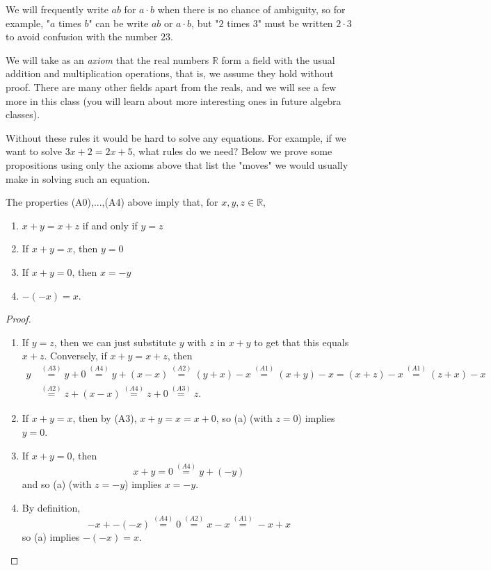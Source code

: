 \documentclass[11pt,dvipsnames]{book}
\numberwithin{figure}{section} %
\numberwithin{table}{section} %
\begin{document}
We will frequently write $ab$ for $a\cdot b$ when there is no chance of ambiguity, so for example, "$a$ times $b$" can be write $ab$ or $a\cdot b$, but "$2$ times $3$" must be written $2\cdot 3$ to avoid confusion with the number $23$.

We will take as an {\it axiom} that the real numbers $\mathbb{R}$ form a field with the usual addition and multiplication operations, that is, we assume they hold without proof.  There are many other fields apart from the reals, and we will see a few more in this class (you will learn about more interesting ones in future algebra classes).

Without these rules it would be hard to solve any equations. For example, if we want to solve $3x+2=2x+5$, what rules do we need? Below we prove some propositions using only the axioms above that list the "moves" we would usually make in solving such an equation.

\begin{proposition}
\label{p:field-consequences}
The properties (A0),...,(A4) above imply that, for $x,y,z\in \mathbb{R}$,
\begin{enumerate}[label=(\alph*)]
\item $x+y=x+z$ if and only if $y=z$
\item If $x+y=x$, then $y=0$
\item If $x+y=0$, then $x=-y$
\item $-(-x)=x$.
\end{enumerate}
\end{proposition}

\begin{proof}
\begin{enumerate}[label=(\alph*)]
\item If $y=z$, then we can just substitute $y$ with $z$ in $x+y$ to get that this equals $x+z$. Conversely, if $x+y=x+z$, then
\begin{align*}
y
& \stackrel{(A3)}{=}y+0\stackrel{(A4)}{=}y+(x-x)\stackrel{(A2)}{=}(y+x)-x\stackrel{(A1)}{=}(x+y)-x
=(x+z)-x\stackrel{(A1)}{=}(z+x)-x\\
&
\stackrel{(A2)}{=}z+(x-x)
\stackrel{(A4)}{=}z+0
\stackrel{(A3)}{=}z.
\end{align*}

\item If $x+y=x$, then by (A3), $x+y=x=x+0$, so (a) (with $z=0$) implies $y=0$.
\item If $x+y=0$, then
\[
x+y=0 \stackrel{(A4)}{=}y+(-y)
\]
and so (a) (with $z=-y$) implies $x=-y$.

\item By definition,
\[
-x+-(-x)\stackrel{(A4)}{=}
0\stackrel{(A2)}{=}x-x
\stackrel{(A1)}{=}-x+x
\]
so (a) implies $-(-x)=x$.
\end{enumerate}
\end{proof}
\end{document}
